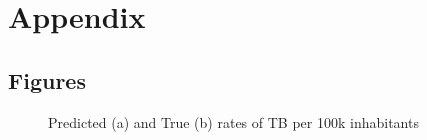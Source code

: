 
\section{Appendix}

\subsection{Figures}

\begin{figure}[H]
	\centering
	\qquad
	\caption{Predicted (a) and True (b) rates of TB per 100k inhabitants}%
	\label{fig:pred_TB_rate_map}%
\end{figure}

